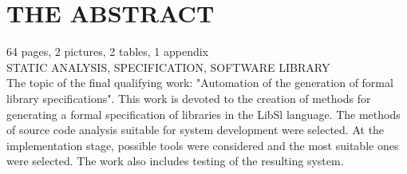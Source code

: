 \chapter*{THE ABSTRACT}
\thispagestyle{empty}

64 pages, 2 pictures, 2 tables, 1 appendix \\

STATIC ANALYSIS, SPECIFICATION, SOFTWARE LIBRARY \\

The topic of the final qualifying work: "Automation of the generation of formal library specifications".
This work is devoted to the creation of methods for generating a formal specification of libraries in the LibSl language.
The methods of source code analysis suitable for system development were selected.
At the implementation stage, possible tools were considered and the most suitable ones were selected.
The work also includes testing of the resulting system.